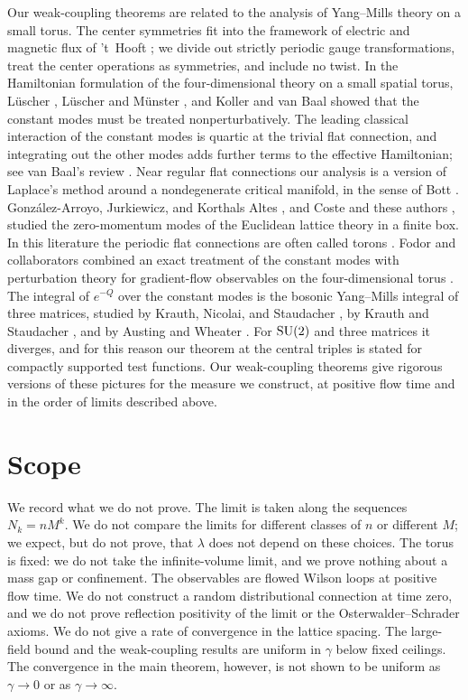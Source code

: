 Our weak-coupling theorems are related to the analysis of Yang--Mills theory on a small torus. The center symmetries fit into the framework of electric and magnetic flux of 't~Hooft \cite{Hooft1979}; we divide out strictly periodic gauge transformations, treat the center operations as symmetries, and include no twist. In the Hamiltonian formulation of the four-dimensional theory on a small spatial torus, L\"uscher \cite{Luscher1983Torus}, L\"uscher and M\"unster \cite{LuscherMunster1984}, and Koller and van Baal \cite{KollerVanBaal1988} showed that the constant modes must be treated nonperturbatively. The leading classical interaction of the constant modes is quartic at the trivial flat connection, and integrating out the other modes adds further terms to the effective Hamiltonian; see van Baal's review \cite{VanBaal2001}. Near regular flat connections our analysis is a version of Laplace's method around a nondegenerate critical manifold, in the sense of Bott \cite{Bott1954CriticalManifolds}. Gonz\'alez-Arroyo, Jurkiewicz, and Korthals Altes \cite{GonzalezArroyo1983}, and Coste and these authors \cite{CosteEtAl1985ZeroMomentum}, studied the zero-momentum modes of the Euclidean lattice theory in a finite box. In this literature the periodic flat connections are often called torons \cite{GonzalezArroyo1998}. Fodor and collaborators combined an exact treatment of the constant modes with perturbation theory for gradient-flow observables on the four-dimensional torus \cite{FodorEtAl2012FiniteVolumeFlow}. The integral of $e^{-Q}$ over the constant modes is the bosonic Yang--Mills integral of three matrices, studied by Krauth, Nicolai, and Staudacher \cite{KrauthNicolaiStaudacher1998}, by Krauth and Staudacher \cite{KrauthStaudacher1998FiniteIntegrals}, and by Austing and Wheater \cite{AustingWheater2001Convergence}. For $\mathrm{SU}(2)$ and three matrices it diverges, and for this reason our theorem at the central triples is stated for compactly supported test functions. Our weak-coupling theorems give rigorous versions of these pictures for the measure we construct, at positive flow time and in the order of limits described above.

\section{Scope}\label{s1:scope}

We record what we do not prove. The limit is taken along the sequences $N_k=nM^k$. We do not compare the limits for different classes of $n$ or different $M$; we expect, but do not prove, that $\lambda$ does not depend on these choices. The torus is fixed: we do not take the infinite-volume limit, and we prove nothing about a mass gap or confinement. The observables are flowed Wilson loops at positive flow time. We do not construct a random distributional connection at time zero, and we do not prove reflection positivity of the limit or the Osterwalder--Schrader axioms. We do not give a rate of convergence in the lattice spacing. The large-field bound and the weak-coupling results are uniform in $\gamma$ below fixed ceilings. The convergence in the main theorem, however, is not shown to be uniform as $\gamma\to0$ or as $\gamma\to\infty$.

